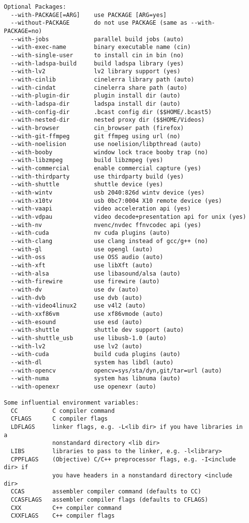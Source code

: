 \begin{verbatim}
Optional Packages:
  --with-PACKAGE[=ARG]    use PACKAGE [ARG=yes]
  --without-PACKAGE       do not use PACKAGE (same as --with-PACKAGE=no)
  --with-jobs             parallel build jobs (auto)
  --with-exec-name        binary executable name (cin)
  --with-single-user      to install cin in bin (no)
  --with-ladspa-build     build ladspa library (yes)
  --with-lv2              lv2 library support (yes)
  --with-cinlib           cinelerra library path (auto)
  --with-cindat           cinelerra share path (auto)
  --with-plugin-dir       plugin install dir (auto)
  --with-ladspa-dir       ladspa install dir (auto)
  --with-config-dir       .bcast config dir ($$HOME/.bcast5)
  --with-nested-dir       nested proxy dir ($$HOME/Videos)
  --with-browser          cin_browser path (firefox)
  --with-git-ffmpeg       git ffmpeg using url (no)
  --with-noelision        use noelision/libpthread (auto)
  --with-booby            window lock trace booby trap (no)
  --with-libzmpeg         build libzmpeg (yes)
  --with-commercial       enable commercial capture (yes)
  --with-thirdparty       use thirdparty build (yes)
  --with-shuttle          shuttle device (yes)
  --with-wintv            usb 2040:826d wintv device (yes)
  --with-x10tv            usb 0bc7:0004 X10 remote device (yes)
  --with-vaapi            video acceleration api (yes)
  --with-vdpau            video decode+presentation api for unix (yes)
  --with-nv               nvenc/nvdec ffnvcodec api (yes)
  --with-cuda             nv cuda plugins (auto)
  --with-clang            use clang instead of gcc/g++ (no)
  --with-gl               use opengl (auto)
  --with-oss              use OSS audio (auto)
  --with-xft              use libXft (auto)
  --with-alsa             use libasound/alsa (auto)
  --with-firewire         use firewire (auto)
  --with-dv               use dv (auto)
  --with-dvb              use dvb (auto)
  --with-video4linux2     use v4l2 (auto)
  --with-xxf86vm          use xf86vmode (auto)
  --with-esound           use esd (auto)
  --with-shuttle          shuttle dev support (auto)
  --with-shuttle_usb      use libusb-1.0 (auto)
  --with-lv2              use lv2 (auto)
  --with-cuda             build cuda plugins (auto)
  --with-dl               system has libdl (auto)
  --with-opencv           opencv=sys/sta/dyn,git/tar=url (auto)
  --with-numa             system has libnuma (auto)
  --with-openexr          use openexr (auto)

Some influential environment variables:
  CC          C compiler command
  CFLAGS      C compiler flags
  LDFLAGS     linker flags, e.g. -L<lib dir> if you have libraries in a
              nonstandard directory <lib dir>
  LIBS        libraries to pass to the linker, e.g. -l<library>
  CPPFLAGS    (Objective) C/C++ preprocessor flags, e.g. -I<include dir> if
              you have headers in a nonstandard directory <include dir>
  CCAS        assembler compiler command (defaults to CC)
  CCASFLAGS   assembler compiler flags (defaults to CFLAGS)
  CXX         C++ compiler command
  CXXFLAGS    C++ compiler flags


\end{verbatim}
